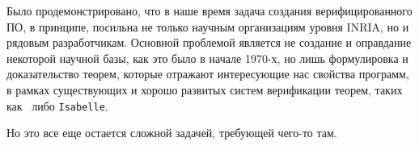 \newpage

\Conc

Было продемонстрировано, что в наше время задача создания верифицированного ПО, в принципе, посильна не только научным организациям уровня INRIA, но и рядовым разработчикам. Основной проблемой является не создание и оправдание некоторой научной базы, как это было в начале 1970-х, но лишь формулировка и доказательство теорем, которые отражают интересующие нас свойства программ, в рамках существующих и хорошо развитых систем верификации теорем, таких как \tcoq~либо \texttt{Isabelle}.

Но это все еще остается сложной задачей, требующей чего-то там.

\printbibliography[%
    heading=bibintoc%
]

\appendix
{}

